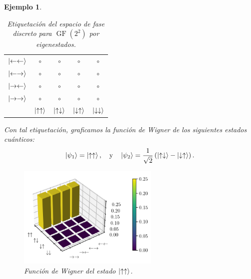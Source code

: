 \documentclass[a4paper,11pt]{report}
\DeclareMathOperator{\GF}{GF}
\newtheorem{example}{Ejemplo}
\begin{document}
\begin{example}
    \begin{table}[!ht]
      \centering
      \begin{tabular}{c c c c c}
        $\ket{\leftarrow\leftarrow}$ & $\circ$ & $\circ$ &
        $\circ$ & $\circ$ \\[7pt]
        $\ket{\leftarrow\rightarrow}$ & $\circ$ & $\circ$ &
        $\circ$ & $\circ$ \\[7pt]
        $\ket{\rightarrow\leftarrow}$ & $\circ$ & $\circ$ &
        $\circ$ & $\circ$ \\[7pt]
        $\ket{\rightarrow\rightarrow}$ & $\circ$ & $\circ$ &
        $\circ$ & $\circ$ \\[7pt]
        & $\ket{\uparrow\uparrow}$ &
        $\ket{\uparrow\downarrow}$
        & $\ket{\downarrow\uparrow}$ &
        $\ket{\downarrow\downarrow}$
      \end{tabular}
      \caption{Etiquetación del espacio de fase discreto
      para $\GF(2^2)$ por eigenestados.}
      \label{tab:state_phase_space}
    \end{table}

    Con tal etiquetación, graficamos la función de Wigner de
    los siguientes estados cuánticos:
    \[
      \ket{\psi_1}
      = \ket{\uparrow\uparrow},
      \quad
      \text{y}
      \quad
      \ket{\psi_2}
      = \frac{1}{\sqrt{2}} \left( \ket{\uparrow\downarrow} -
      \ket{\downarrow\uparrow} \right). 
    \]
    
    \begin{figure}[ht]
      \centering
      \includegraphics[width=0.6\textwidth]{imgs/wigner-desargues-2-2-s1.png}
      \caption{Función de Wigner del estado
        $\ket{\uparrow\uparrow}$.}
      \label{fig:wigner-desargues-2-2-s1}
    \end{figure}


\end{example}
\end{document}
